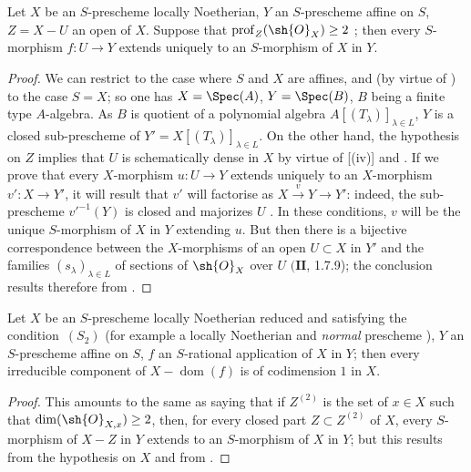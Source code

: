 \begin{proposition}[20.4.11]
\label{IV.20.4.11}
Let $X$ be an $S$-prescheme locally Noetherian, $Y$ an $S$-prescheme affine on $S$, $Z=X-U$ an open of $X$.
Suppose that $\operatorname{prof}_Z(\sh{O}_X)\geq 2$ ;
then every $S$-morphism $f:U\to Y$ extends uniquely to an $S$-morphism of $X$ in $Y$.
\end{proposition}

\begin{proof}
We can restrict to the case where $S$ and $X$ are affines, and (by virtue of ) to the case $S=X$;
so one has $X=\Spec(A)$, $Y=\Spec(B)$, $B$ being a finite type $A$-algebra.
As $B$ is quotient of a polynomial algebra $A[(T_\lambda)]_{\lambda\in L}$, $Y$ is a closed sub-prescheme of $Y'=X[(T_\lambda)]_{\lambda\in L}$.
On the other hand, the hypothesis on $Z$ implies that $U$ is schematically dense in $X$ by virtue of [(iv)] and .
If we prove that every $X$-morphism $u:U\to Y$ extends uniquely to an $X$-morphism $v':X\to Y'$, it will result that $v'$ will factorise as $X\xrightarrow{v}Y\to Y'$:
indeed, the sub-prescheme $v'^{-1}(Y)$ is closed and majorizes $U$ .
In these conditions, $v$ will be the unique $S$-morphism of $X$ in $Y$ extending $u$.
But then there is a bijective correspondence between the $X$-morphisms of an open $U\subset X$ in $Y'$ and the families $(s_\lambda)_{\lambda\in L}$ of sections of $\sh{O}_X$ over $U$ $(\mathbf{II}$, 1.7.9);
the conclusion results therefore from .
\end{proof}

\begin{corollary}[20.4.12]
\label{IV.20.4.12}
Let $X$ be an $S$-prescheme locally Noetherian reduced and satisfying the condition~$(S_2)$  (for example a locally Noetherian and \emph{normal} prescheme ), $Y$ an $S$-prescheme affine on $S$, $f$ an $S$-rational application of $X$ in $Y$;
then every irreducible component of $X-\operatorname{dom}(f)$ is of codimension $1$ in $X$.
\end{corollary}

\begin{proof}
This amounts to the same as saying that if $Z^{(2)}$ is the set of $x\in X$ such that $\dim(\sh{O}_{X,x})\geq 2$, then, for every closed part $Z\subset Z^{(2)}$ of $X$, every $S$-morphism of $X-Z$ in $Y$ extends to an $S$-morphism of $X$ in $Y$;
but this results from the hypothesis on $X$  and from .
\end{proof}

